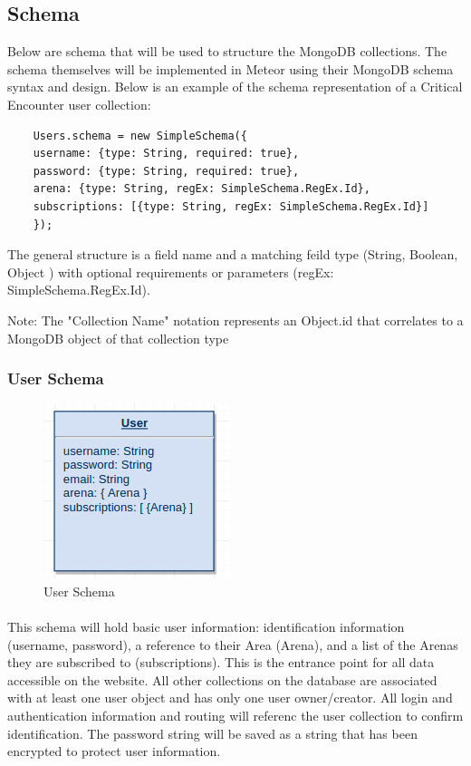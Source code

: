\documentclass[12pt,a4paper]{report}
\begin{document}
	\subsection{Schema}
	Below are schema that will be used to structure the MongoDB collections. The schema themselves will be implemented in Meteor using their MongoDB schema syntax and design. Below is an example of the schema representation of a Critical Encounter user collection:
	
	\begin{lstlisting}
	Users.schema = new SimpleSchema({
	username: {type: String, required: true},
	password: {type: String, required: true},
	arena: {type: String, regEx: SimpleSchema.RegEx.Id},
	subscriptions: [{type: String, regEx: SimpleSchema.RegEx.Id}]
	});
	\end{lstlisting}
	
	The general structure is a field name and a matching feild type (String, Boolean, Object ) with optional requirements or parameters (regEx: SimpleSchema.RegEx.Id).
	
	Note: The { "Collection Name" } notation represents an Object.id that correlates to a MongoDB object of that collection type
	\subsubsection{User Schema}
	\begin{figure}[h]
		\centering
		\includegraphics[scale=.75]{schema-user}
		\caption{User Schema}
		\label{fig: User Schema }
	\end{figure}
	
	\paragraph{}This schema will hold basic user information: identification information (username, password), a reference to their Area (Arena), and a list of the Arenas they are subscribed to (subscriptions). This is the entrance point for all data accessible on the website. All other collections on the database are associated with at least one user object and has only one user owner/creator. All login and authentication information and routing will referenc the user collection to confirm identification. The password string will be saved as a string that has been encrypted to protect user information.
\end{document}
